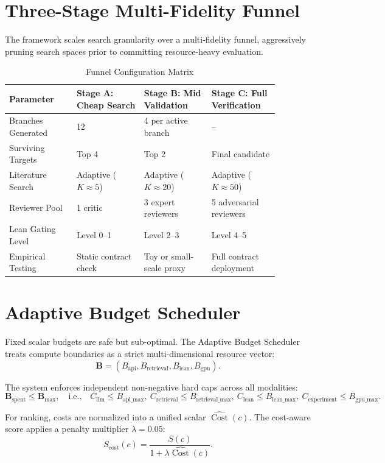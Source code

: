\documentclass[11pt]{article}
\newcommand{\Cost}{\operatorname{Cost}}
\begin{document}
\section{Three-Stage Multi-Fidelity Funnel}

The framework scales search granularity over a multi-fidelity funnel, aggressively pruning search spaces prior to committing resource-heavy evaluation.

\begin{table}[H]
\centering
\caption{Funnel Configuration Matrix}
\begin{tabular}{p{0.22\linewidth} p{0.22\linewidth} p{0.22\linewidth} p{0.22\linewidth}}
\toprule
Parameter & Stage A: Cheap Search & Stage B: Mid Validation & Stage C: Full Verification \\
\midrule
Branches Generated & 12 & 4 per active branch & -- \\
Surviving Targets & Top 4 & Top 2 & Final candidate \\
Literature Search & Adaptive ($K\approx5$) & Adaptive ($K\approx20$) & Adaptive ($K\approx50$) \\
Reviewer Pool & 1 critic & 3 expert reviewers & 5 adversarial reviewers \\
Lean Gating Level & Level 0--1 & Level 2--3 & Level 4--5 \\
Empirical Testing & Static contract check & Toy or small-scale proxy & Full contract deployment \\
\bottomrule
\end{tabular}
\end{table}

\section{Adaptive Budget Scheduler}

Fixed scalar budgets are safe but sub-optimal. The Adaptive Budget Scheduler treats compute boundaries as a strict multi-dimensional resource vector:
$$
\mathbf{B} = (B_{\text{api}}, B_{\text{retrieval}}, B_{\text{lean}}, B_{\text{gpu}}).
$$

The system enforces independent non-negative hard caps across all modalities:
$$
\mathbf{B}_{\text{spent}} \leq \mathbf{B}_{\max}, \quad \text{i.e.,} \quad C_{\text{llm}}\leq B_{\text{api\_max}}, \ C_{\text{retrieval}}\leq B_{\text{retrieval\_max}}, \ C_{\text{lean}}\leq B_{\text{lean\_max}}, \ C_{\text{experiment}}\leq B_{\text{gpu\_max}}.
$$

For ranking, costs are normalized into a unified scalar $\widehat{\Cost}(c)$. The cost-aware score applies a penalty multiplier $\lambda=0.05$:
$$
S_{\text{cost}}(c) = \frac{S(c)}{1+\lambda\widehat{\Cost}(c)}.
$$
\end{document}
